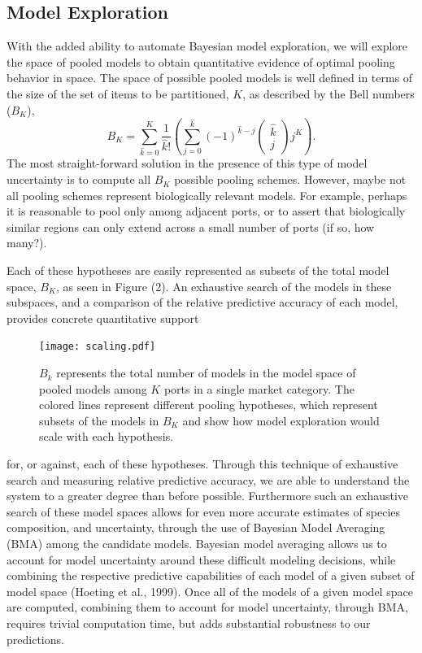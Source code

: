 \documentclass[12pt]{article}
\begin{document}
%
\subsection{Model Exploration}\label{model-exploration}

%
With the added ability to automate Bayesian model exploration, we will explore 
the space of pooled models to obtain quantitative evidence of optimal pooling behavior in space. 
The space of possible pooled models is
well defined in terms of the size of the set of items to be partitioned,
$K$, as described by the Bell numbers ($B_K$),
\[B_K=\sum_{\hat k=0}^{K} \frac{1}{\hat k!} \left( \sum_{j=0}^{\hat k} (-1)^{\hat k -j} \left(\substack{\hat k \\ j}\right) j^K \right).\]
The most straight-forward solution in the presence of this type of model
uncertainty is to compute all $B_K$ possible pooling schemes.
However, maybe not all pooling schemes represent biologically relevant models. 
For example, perhaps it is reasonable to pool only among adjacent ports, or 
to assert that biologically similar regions can only extend across a small number 
of ports (if so, how many?).

%
Each of these hypotheses are easily represented as subsets of the total
model space, $B_K$, as seen in Figure (2). An exhaustive search of the
models in these subspaces, and a comparison of the relative predictive
accuracy of each model, provides concrete quantitative support 
%
\begin{figure}
\vspace{-0.9cm}
\texttt{[image: scaling.pdf]}
\vspace{-1.2cm}
\caption{
$B_k$ represents the total number of models in the model space
of pooled models among $K$ ports in a single market category. 
The colored lines represent different pooling hypotheses, which represent 
subsets of the models in $B_K$ and show how model exploration would
scale with each hypothesis.
}
\end{figure}
%
for, or against, each of these hypotheses. Through this technique of exhaustive
search and measuring relative predictive accuracy, we are able to
understand the system to a greater degree than before possible.
Furthermore such an exhaustive search of these model spaces allows for
even more accurate estimates of species composition, and uncertainty,
through the use of Bayesian Model Averaging (BMA) among the candidate models.
Bayesian model averaging allows us to account for model uncertainty
around these difficult modeling decisions, while combining the
respective predictive capabilities of each model of a given subset of
model space (Hoeting et al., 1999). Once all of the models of a given model space are computed, combining
them to account for model uncertainty, through BMA, requires trivial computation time, but adds substantial robustness to our predictions. 
\end{document}
